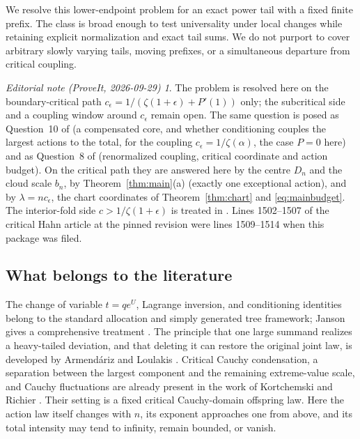 \documentclass[11pt,a4paper]{article}
\numberwithin{equation}{section}
\theoremstyle{definition}
\theoremstyle{remark}
\newtheorem*{ednote}{Editorial note (ProveIt, 2026-09-29)}
\newcommand{\ee}{\epsilon}
\begin{document}
We resolve this lower-endpoint problem for an exact power tail with a fixed
finite prefix. The class is broad enough to test universality under local
changes while retaining explicit normalization and exact tail sums. We do
not purport to cover arbitrary slowly varying tails, moving prefixes, or a
simultaneous departure from critical coupling.
\begin{ednote}
The problem is resolved here on the boundary-critical path
$c_\ee=1/(\zeta(1+\ee)+P'(1))$ only; the subcritical side and a coupling
window around $c_\ee$ remain open. The same question is posed as
Question~10 of 
(a compensated core, and whether conditioning couples the largest actions
to the total, for the coupling $c_\ee=1/\zeta(\alpha)$, the case $P=0$
here) and as Question~8 of 
(renormalized coupling, critical coordinate and action budget). On the
critical path they are answered here by the centre $D_n$ and the cloud
scale $b_n$, by Theorem~\ref{thm:main}(a) (exactly one exceptional action),
and by $\lambda=nc_\ee$, the chart coordinates of Theorem~\ref{thm:chart}
and \eqref{eq:mainbudget}. The interior-fold side $c>1/\zeta(1+\ee)$ is
treated in . Lines
1502--1507 of the critical Hahn article at the pinned revision were lines
1509--1514 when this package was filed.
\end{ednote}

\subsection{What belongs to the literature}
The change of variable $t=qe^U$, Lagrange inversion, and conditioning
identities belong to the standard allocation and simply generated tree
framework; Janson gives a comprehensive treatment \cite{janson}. The
principle that one large summand realizes a heavy-tailed deviation, and
that deleting it can restore the original joint law, is developed by
Armend\'ariz and Loulakis \cite{al}. Critical Cauchy condensation, a
separation between the largest component and the remaining extreme-value
scale, and Cauchy fluctuations are already present in the work of
Kortchemski and Richier \cite{kr}. Their setting is a fixed critical
Cauchy-domain offspring law. Here the action law itself changes with $n$,
its exponent approaches one from above, and its total intensity may tend
to infinity, remain bounded, or vanish.
\end{document}
